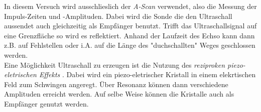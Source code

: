In diesem Versuch wird ausschlieslich der \textit{A-Scan} verwendet, also die Messung der Impuls-Zeiten und -Amplituden.
Dabei wird die Sonde die den Ultraschall aussendet auch gleichzeitig als Empfänger benutzt. Trifft das Ultraschallsignal
auf eine Grenzfläche so wird es reflektiert.
Anhand der Laufzeit
des Echso kann dann z.B. auf Fehlstellen oder i.A. auf die Länge des "duchschallten" Weges geschlossen werden. \\
Eine Möglichkeit Ultraschall zu erzeugen ist die Nutzung des \textit{reziproken piezo-eletrischen Effekts} \cite{Anleitung}. Dabei wird ein
piezo-eletrischer Kristall in einem elekrtischen Feld zum Schwingen angeregt. Über Resonanz können dann verschiedene Amplituden erreicht werden.
Auf selbe Weise können die Kristalle auch als Empfänger genutzt werden.

